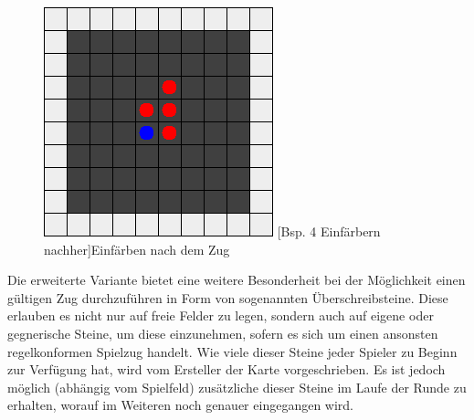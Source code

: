 \documentclass[12pt,a4paper,bibliography=totocnumbered,listof=totocnumbered]{article}
\begin{document}
\begin{figure}[H]
\begin{minipage}[c]{0.4\textwidth}
	\centering
	\includegraphics[width=\textwidth]{pics/reversi_original_map_capture_2.png}
	[Bsp. 4 Einfärbern nachher]{Einfärben nach dem Zug}
	\label{fig:capture_post}
\end{minipage}
\end{figure}

Die erweiterte Variante bietet eine weitere Besonderheit bei der Möglichkeit einen gültigen Zug durchzuführen in Form von sogenannten Überschreibsteine. Diese erlauben es nicht nur auf freie Felder zu legen, sondern auch auf eigene oder gegnerische Steine, um diese einzunehmen, sofern es sich um einen ansonsten regelkonformen Spielzug handelt. Wie viele dieser Steine jeder Spieler zu Beginn zur Verfügung hat, wird vom Ersteller der Karte vorgeschrieben. Es ist jedoch möglich (abhängig vom Spielfeld) zusätzliche dieser Steine im Laufe der Runde zu erhalten, worauf im Weiteren noch genauer eingegangen wird. 
\end{document}
